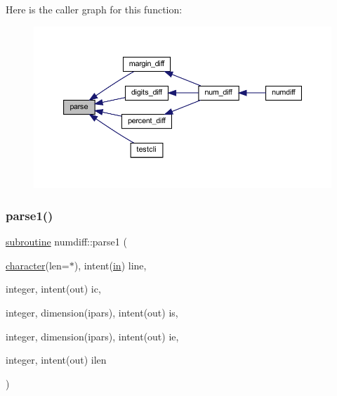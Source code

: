 Here is the caller graph for this function\+:
\nopagebreak
\begin{figure}[H]
\begin{center}
\leavevmode
\includegraphics[width=350pt]{numdiff_8f90_a78c07a4665edf04b67eaeeb072b4e115_icgraph}
\end{center}
\end{figure}
\mbox{\label{numdiff_8f90_aeee37c7b0374de09f2c99faac68f1bd5}} 
\subsubsection{\texorpdfstring{parse1()}{parse1()}}
{\footnotesize\ttfamily \hyperlink{M__stopwatch_83_8txt_acfbcff50169d691ff02d4a123ed70482}{subroutine} numdiff\+::parse1 (\begin{DoxyParamCaption}\item[{\hyperlink{option__stopwatch_83_8txt_abd4b21fbbd175834027b5224bfe97e66}{character}(len=$\ast$), intent(\hyperlink{M__journal_83_8txt_afce72651d1eed785a2132bee863b2f38}{in})}]{line,  }\item[{integer, intent(out)}]{ic,  }\item[{integer, dimension(ipars), intent(out)}]{is,  }\item[{integer, dimension(ipars), intent(out)}]{ie,  }\item[{integer, intent(out)}]{ilen }\end{DoxyParamCaption})}

\mbox{\label{numdiff_8f90_a3a10618690bb709040a044704b25ec7d}} 
